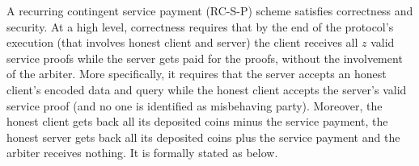 A recurring contingent service payment (RC-S-P)  scheme satisfies correctness and security. At a high level, correctness requires that by the end of the protocol's execution  (that involves  honest client and server) the client receives all $z$ valid service proofs while the server gets paid  for the proofs, without the involvement of the arbiter. More specifically, it requires that the server accepts an honest client's encoded data and query while the honest client accepts the server's valid service proof (and no one is identified as misbehaving party). Moreover, the honest client gets back all its deposited coins minus the service payment, the honest server gets back all its deposited coins  plus the service payment and the arbiter receives nothing. It is formally stated as below.



